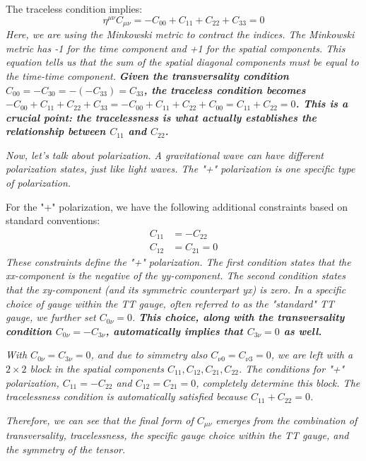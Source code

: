\documentclass{article}
\begin{document}
The traceless condition implies:
\begin{equation}
\eta^{\mu \nu} C_{\mu \nu} = -C_{00} + C_{11} + C_{22} + C_{33} = 0
\end{equation}
\emph{Here, we are using the Minkowski metric to contract the indices. The Minkowski metric has -1 for the time component and +1 for the spatial components. This equation tells us that the sum of the spatial diagonal components must be equal to the time-time component.} \emph{\textbf{Given the transversality condition $C_{00} = -C_{30} = -(-C_{33}) = C_{33}$, the traceless condition becomes $-C_{00} + C_{11} + C_{22} + C_{33} = -C_{00}+C_{11}+C_{22}+C_{00} = C_{11} + C_{22} = 0$. This is a crucial point: the tracelessness is what actually establishes the relationship between $C_{11}$ and $C_{22}$.}}

\emph{Now, let's talk about polarization. A gravitational wave can have different polarization states, just like light waves. The "+" polarization is one specific type of polarization.}

For the "+" polarization, we have the following additional constraints based on standard conventions:
\begin{align}
C_{11} &= -C_{22} \\
C_{12} &= C_{21} = 0
\end{align}
\emph{These constraints define the "+" polarization. The first condition states that the xx-component is the negative of the yy-component. The second condition states that the xy-component (and its symmetric counterpart yx) is zero.} \emph{In a specific choice of gauge within the TT gauge, often referred to as the "standard" TT gauge, we further set $C_{0\nu} = 0$. \textbf{This choice, along with the transversality condition $C_{0\nu} = -C_{3\nu}$, automatically implies that $C_{3\nu} = 0$ as well.}}

\emph{With $C_{0\nu} = C_{3\nu} = 0$, and due to simmetry also $C_{\nu0} = C_{\nu3} = 0$, we are left with a $2\times2$ block in the spatial components $C_{11}, C_{12}, C_{21}, C_{22}$. The conditions for "+" polarization, $C_{11} = -C_{22}$ and $C_{12} = C_{21} = 0$, completely determine this block. The tracelessness condition is automatically satisfied because $C_{11} + C_{22} = 0$.}

\emph{Therefore, we can see that the final form of $C_{\mu\nu}$ emerges from the combination of transversality, tracelessness, the specific gauge choice within the TT gauge, and the symmetry of the tensor.}
\end{document}
